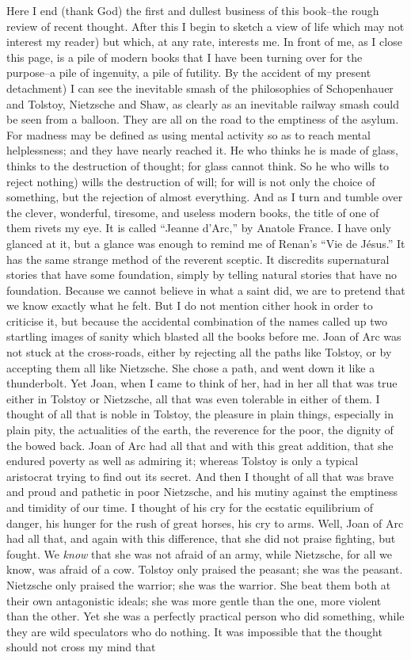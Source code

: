 \documentclass{book}
\begin{document}
Here I end (thank God) the first and dullest business of this book–the rough review of recent thought. After this I begin to sketch a view of life which may not interest my reader) but which, at any rate, interests me. In front of me, as I close this page, is a pile of modern books that I have been turning over for the purpose–a pile of ingenuity, a pile of futility. By the accident of my present detachment) I can see the inevitable smash of the philosophies of Schopenhauer and Tolstoy, Nietzsche and Shaw, as clearly as an inevitable railway smash could be seen from a balloon. They are all on the road to the emptiness of the asylum. For madness may be defined as using mental activity so as to reach mental helplessness; and they have nearly reached it. He who thinks he is made of glass, thinks to the destruction of thought; for glass cannot think. So he who wills to reject nothing) wills the destruction of will; for will is not only the choice of something, but the rejection of almost everything. And as I turn and tumble over the clever, wonderful, tiresome, and useless modern books, the title of one of them rivets my eye. It is called “Jeanne d’Arc,” by Anatole France. I have only glanced at it, but a glance was enough to remind me of Renan’s “Vie de Jésus.” It has the same strange method of the reverent sceptic. It discredits supernatural stories that have some foundation, simply by telling natural stories that have no foundation. Because we cannot believe in what a saint did, we are to pretend that we know exactly what he felt. But I do not mention cither hook in order to criticise it, but because the accidental combination of the names called up two startling images of sanity which blasted all the books before me. Joan of Arc was not stuck at the cross-roads, either by rejecting all the paths like Tolstoy, or by accepting them all like Nietzsche. She chose a path, and went down it like a thunderbolt. Yet Joan, when I came to think of her, had in her all that was true either in Tolstoy or Nietzsche, all that was even tolerable in either of them. I thought of all that is noble in Tolstoy, the pleasure in plain things, especially in plain pity, the actualities of the earth, the reverence for the poor, the dignity of the bowed back. Joan of Arc had all that and with this great addition, that she endured poverty as well as admiring it; whereas Tolstoy is only a typical aristocrat trying to find out its secret. And then I thought of all that was brave and proud and pathetic in poor Nietzsche, and his mutiny against the emptiness and timidity of our time. I thought of his cry for the ecstatic equilibrium of danger, his hunger for the rush of great horses, his cry to arms. Well, Joan of Arc had all that, and again with this difference, that she did not praise fighting, but fought. We \emph{know} that she was not afraid of an army, while Nietzsche, for all we know, was afraid of a cow. Tolstoy only praised the peasant; she was the peasant. Nietzsche only praised the warrior; she was the warrior. She beat them both at their own antagonistic ideals; she was more gentle than the one, more violent than the other. Yet she was a perfectly practical person who did something, while they are wild speculators who do nothing. It was impossible that the thought should not cross my mind that 
\end{document}
